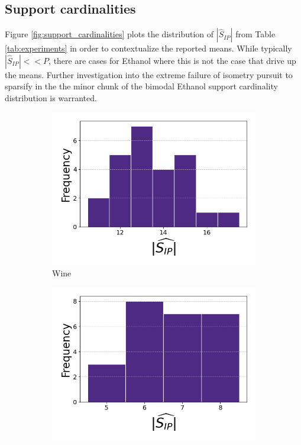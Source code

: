 \newpage

\subsection{Support cardinalities}
\label{sec:support_cardinalities}

Figure \ref{fig:support_cardinalities} plots the distribution of $|\widehat{S}_{IP}|$ from Table \ref{tab:experiments} in order to contextualize the reported means.
While typically $|\widehat{S}_{IP}| << P$, there are cases for Ethanol where this is not the case that drive up the means.
Further investigation into the extreme failure of isometry pursuit to sparsify in the the minor chunk of the bimodal Ethanol support cardinality distribution is warranted.

\begin{figure}[t]
    \centering
    \begin{subfigure}[b]{0.45\textwidth}
        \centering
        \includegraphics[width=\textwidth]{../figures/wine_cardinalities}
        \caption{Wine }
        \label{fig:wine_cardinalities}
    \end{subfigure}
    \hfill
    \begin{subfigure}[b]{0.45\textwidth}
        \centering
        \includegraphics[width=\textwidth]{../figures/iris_cardinalities}

\end{subfigure}
\end{figure}
